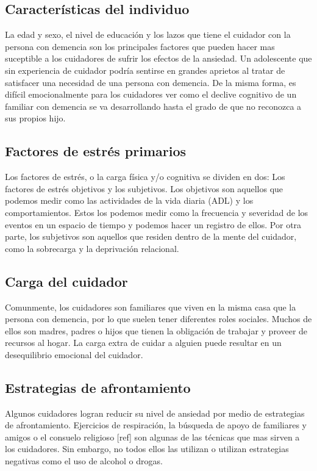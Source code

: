	\subsection{Caracter\'isticas del individuo}{\label{secc:modeloAnsiedadCaregivers}}
		La edad y sexo, el nivel de educaci\'on y los lazos que tiene el cuidador con la persona con demencia son los principales factores que pueden hacer mas suceptible a los cuidadores de sufrir los efectos de la ansiedad. Un adolescente que sin experiencia de cuidador podr\'ia sentirse en grandes aprietos al tratar de satisfacer una necesidad de una persona con demencia. De la misma forma, es dif\'icil emocionalmente para los cuidadores ver como el declive cognitivo de un familiar con demencia se va desarrollando hasta el grado de que no reconozca a sus propios hijo.
	\subsection{Factores de estr\'es primarios}{\label{secc:modeloAnsiedadStressFactors}}
		Los factores de estr\'es, o la carga f\'isica y/o cognitiva se dividen en dos: Los factores de estr\'es objetivos y los subjetivos. Los objetivos son aquellos que podemos medir como las actividades de la vida diaria (ADL) y los comportamientos. Estos los podemos medir como la frecuencia y severidad de los eventos en un espacio de tiempo y podemos hacer un registro de ellos. Por otra parte, los subjetivos son aquellos que residen dentro de la mente del cuidador, como la sobrecarga y la deprivaci\'on relacional.
	\subsection{Carga del cuidador}{\label{secc:modeloAnsiedadSecondaryroles}}
		Comunmente, los cuidadores son familiares que viven en la misma casa que la persona con demencia, por lo que suelen tener diferentes roles sociales. Muchos de ellos son madres, padres o hijos que tienen la obligaci\'on de trabajar y proveer de recursos al hogar. La carga extra de cuidar a alguien puede resultar en un desequilibrio emocional del cuidador.
	
	\subsection{Estrategias de afrontamiento}{\label{secc:modeloAnsiedadCoping}}
		Algunos cuidadores logran reducir su nivel de ansiedad por medio de estrategias de afrontamiento. Ejercicios de respiraci\'on, la b\'usqueda de apoyo de familiares y amigos o el consuelo religioso [ref] son algunas de las t\'ecnicas que mas sirven a los cuidadores. Sin embargo, no todos ellos las utilizan o utilizan estrategias negativas como el uso de alcohol o drogas.

